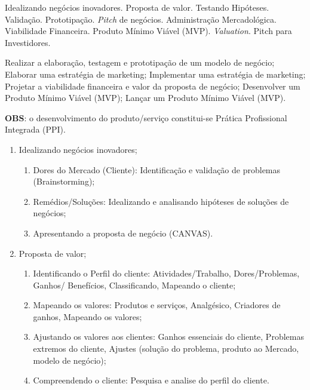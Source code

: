 \begin{pud}

	
	\ementa
	Idealizando negócios inovadores. Proposta de valor. Testando Hipóteses. Validação. Prototipação. \textit{Pitch} de negócios. Administração Mercadológica. Viabilidade Financeira. Produto Mínimo Viável (MVP). \textit{Valuation}. Pitch para Investidores.
	
	\objetivos
	Realizar a elaboração, testagem e prototipação de um modelo de negócio;
	Elaborar uma estratégia de marketing;
    Implementar uma estratégia de marketing; 
    Projetar a viabilidade financeira e valor da proposta de negócio;
    Desenvolver um Produto Mínimo Viável (MVP);
    Lançar um Produto Mínimo Viável (MVP).
	
	\par \textbf{OBS}: o desenvolvimento do produto/serviço constitui-se Prática Profissional Integrada (PPI).
	
	

	\programa
	\begin{description}[itemsep=0em, topsep=0em]
		\item[UNIDADE I:] \quad
		\begin{enumerate}[itemsep=0em, topsep=0em, label*=\arabic*.]
			\item Idealizando negócios inovadores;
			\begin{enumerate}[itemsep=0em, topsep=0em, label*=\arabic*.]
				\item Dores do Mercado (Cliente): Identificação e validação de problemas (Brainstorming);
				\item Remédios/Soluções: Idealizando e analisando hipóteses de soluções de negócios;
				\item Apresentando a proposta de negócio (CANVAS). 
			\end{enumerate}
			
			\item Proposta de valor;
			\begin{enumerate}[itemsep=0em, topsep=0em, label*=\arabic*.]
				\item Identificando o Perfil do cliente: Atividades/Trabalho, Dores/Problemas, Ganhos/
Benefícios, Classificando, Mapeando o cliente;
				\item Mapeando os valores: Produtos e serviços, Analgésico, Criadores de ganhos, Mapeando os valores;
				\item Ajustando os valores aos clientes: Ganhos essenciais do cliente, Problemas extremos do cliente, Ajustes (solução do problema, produto ao Mercado, modelo de negócio);
				\item Compreendendo o cliente: Pesquisa e analise do perfil do cliente. 
			\end{enumerate}
			

\end{enumerate}
\end{description}
\end{pud}
